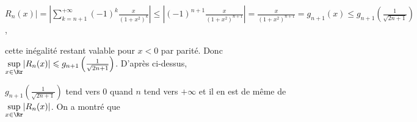 {\begin{enumerate}
{\begin{center}
$R_n(x)|=\left|\sum_{k=n+1}^{+\infty}(-1)^k\frac{x}{(1+x^2)^k}\right|\leqslant\left|(-1)^{n+1}\frac{x}{(1+x^2)^{n+1}}\right|=\frac{x}{(1+x^2)^{n+1}}=g_{n+1}(x)\leqslant g_{n+1}\left(\frac{1}{\sqrt{2n+1}}\right)$,
\end{center}

cette inégalité restant valable pour $x<0$ par parité. Donc $\underset{x\in\Rr}{\text{sup}}|R_n(x)|\leqslant g_{n+1}\left(\frac{1}{\sqrt{2n+1}}\right)$. D'après ci-dessus, 

$g_{n+1}\left(\frac{1}{\sqrt{2n+1}}\right)$ tend vers $0$ quand $n$ tend vers $+\infty$ et il en est de même de $\underset{x\in\Rr}{\text{sup}}|R_n(x)|$. On a montré que

\begin{center}
\end{center}}
\end{enumerate}
}
